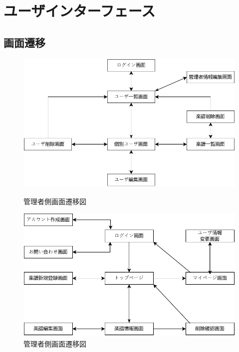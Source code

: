 \chapter{ユーザインターフェース}
\section{画面遷移}
\begin{figure}[H]
    \centering
    \begin{minipage}[b]{.45\textwidth}
        \centering
        \begin{framed}
            \includegraphics[keepaspectratio,width=\textwidth]{ui/管理者側画面遷移図.pdf}
        \end{framed}
        \caption{管理者側画面遷移図}
    \end{minipage}
    \begin{minipage}[b]{.45\textwidth}
        \centering
        \begin{framed}
            \vspace{.2cm}
            \includegraphics[keepaspectratio,width=\textwidth]{ui/利用者側画面遷移図.pdf}
        \end{framed}
        \caption{管理者側画面遷移図}
    \end{minipage}
\end{figure}
